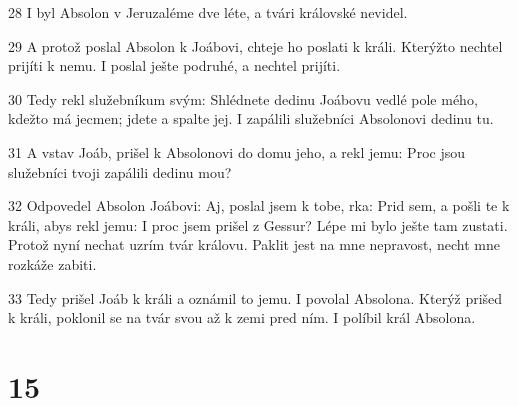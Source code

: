 \par 28 I byl Absolon v Jeruzaléme dve léte, a tvári královské nevidel.
\par 29 A protož poslal Absolon k Joábovi, chteje ho poslati k králi. Kterýžto nechtel prijíti k nemu. I poslal ješte podruhé, a nechtel prijíti.
\par 30 Tedy rekl služebníkum svým: Shlédnete dedinu Joábovu vedlé pole mého, kdežto má jecmen; jdete a spalte jej. I zapálili služebníci Absolonovi dedinu tu.
\par 31 A vstav Joáb, prišel k Absolonovi do domu jeho, a rekl jemu: Proc jsou služebníci tvoji zapálili dedinu mou?
\par 32 Odpovedel Absolon Joábovi: Aj, poslal jsem k tobe, rka: Prid sem, a pošli te k králi, abys rekl jemu: I proc jsem prišel z Gessur? Lépe mi bylo ješte tam zustati. Protož nyní nechat uzrím tvár královu. Paklit jest na mne nepravost, necht mne rozkáže zabiti.
\par 33 Tedy prišel Joáb k králi a oznámil to jemu. I povolal Absolona. Kterýž prišed k králi, poklonil se na tvár svou až k zemi pred ním. I políbil král Absolona.

\chapter{15}

